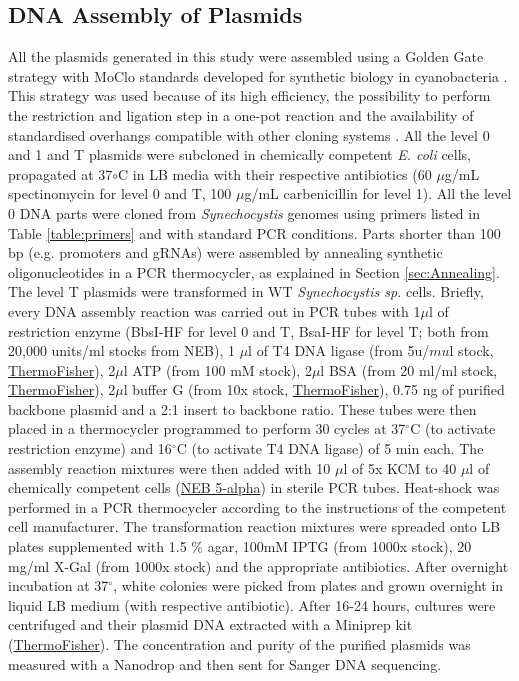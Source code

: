\subsection{DNA Assembly of Plasmids}
All the plasmids generated in this study were assembled using a Golden Gate strategy with MoClo standards developed for synthetic biology in cyanobacteria \citep{Vasudevan2019}. This strategy was used because of its high efficiency, the possibility to perform the restriction and ligation step in a one-pot reaction and the availability of standardised overhangs compatible with other cloning systems \citep{Weber2011}. All the level 0 and 1 and T plasmids were subcloned in  chemically competent \textit{E. coli} cells, propagated at 37$\circ$C in LB media with their respective antibiotics (60 $\mu$g/mL spectinomycin for level 0 and T, 100 $\mu$g/mL carbenicillin for level 1). All the level 0 DNA parts were cloned from \textit{Synechocystis} genomes using primers listed in Table \ref{table:primers} and with standard PCR conditions. Parts shorter than 100 bp (e.g. promoters and gRNAs) were assembled by annealing synthetic oligonucleotides in a PCR thermocycler, as explained in Section \ref{sec:Annealing}. The level T plasmids were transformed in WT \textit{Synechocystis sp.} cells. Briefly, every DNA assembly reaction was carried out in PCR tubes with 1$\mu$l of restriction enzyme (BbsI-HF for level 0 and T, BsaI-HF for level T; both from 20,000 units/ml stocks from NEB), 1 $\mu$l of T4 DNA ligase (from 5u/$mu$l stock, \href{https://www.thermofisher.com/order/catalog/product/EL0011#/EL0011}{ThermoFisher}), 2$\mu$l ATP (from 100 mM stock), 2$\mu$l BSA (from 20 ml/ml stock, \href{https://www.thermofisher.com/order/catalog/product/B14?uk&en#/B14?uk&en}{ThermoFisher}), 2$\mu$l buffer G (from 10x stock, \href{https://www.thermofisher.com/order/catalog/product/BG5?uk&en#/BG5?uk&en}{ThermoFisher}), 0.75 ng of purified backbone plasmid and a 2:1 insert to backbone ratio. These tubes were then placed in a thermocycler programmed to perform 30 cycles at 37$^{\circ}$C (to activate restriction enzyme) and 16$^{\circ}$C (to activate T4 DNA ligase) of 5 min each. The assembly reaction mixtures were then added with 10 $\mu$l of 5x KCM to 40 $\mu$l of chemically competent cells (\href{https://international.neb.com/products/c2987-neb-5-alpha-competent-e-coli-high-efficiency}{NEB 5-alpha}) in sterile PCR tubes. Heat-shock was performed in a PCR thermocycler according to the instructions of the competent cell manufacturer. The transformation reaction mixtures were spreaded onto LB plates supplemented with 1.5 \% agar, 100mM IPTG (from 1000x stock), 20 mg/ml X-Gal (from 1000x stock) and the appropriate antibiotics. After overnight incubation at 37$^{\circ}$, white colonies were picked from plates and grown overnight in liquid LB medium (with respective antibiotic). After 16-24 hours, cultures were centrifuged and their plasmid DNA extracted with a Miniprep kit (\href{https://www.thermofisher.com/order/catalog/product/K0503?ICID=cvc-pdna-miniprep-c1t1#/K0503?ICID=cvc-pdna-miniprep-c1t1}{ThermoFisher}). The concentration and purity of the purified plasmids was measured with a Nanodrop and then sent for Sanger DNA sequencing. 


